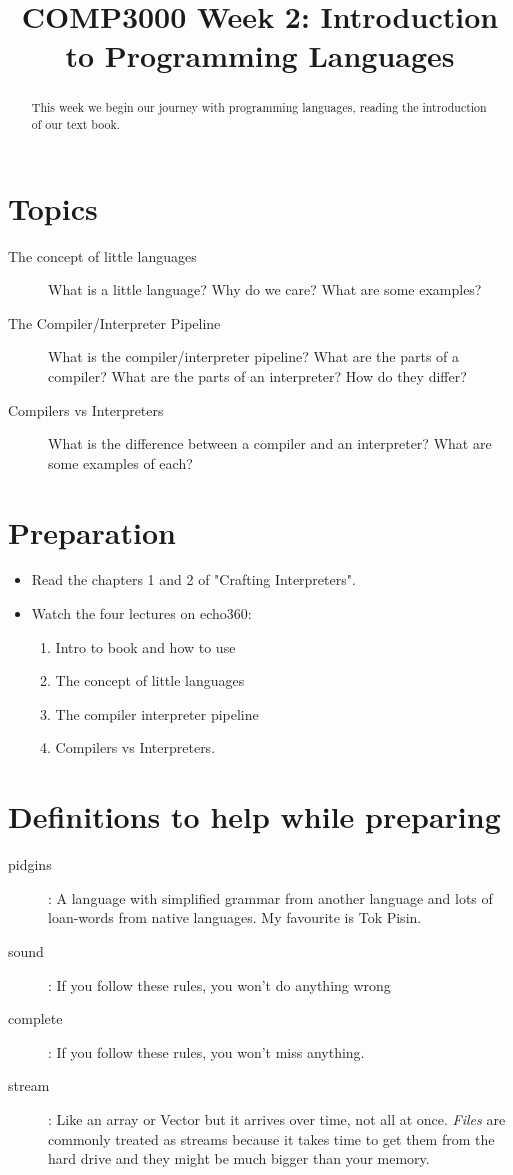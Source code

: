 \documentclass[twoside=false, DIV=14]{scrartcl}
\title{\color{redish} \vspace{-1em}COMP3000 Week 2: Introduction to Programming Languages}
\begin{document}
{\color{blackish}\maketitle}\vspace{-7em}

\begin{abstract}
  This week we begin our journey with programming languages, reading the introduction of our text book.
\end{abstract}

\section*{Topics}
\begin{description}
\item[The concept of little languages]  What is a little language?  Why do we care?  What are some examples?
\item[The Compiler/Interpreter Pipeline]  What is the compiler/interpreter pipeline?  What are the parts of a compiler?  What are the parts of an interpreter?  How do they differ?
\item[Compilers vs Interpreters]  What is the difference between a compiler and an interpreter?  What are some examples of each?
\end{description}
\section*{Preparation}
\begin{itemize}
\item Read the chapters 1 and 2 of "Crafting Interpreters".
\item Watch the four lectures on echo360: 
\begin{enumerate}
\item Intro to book and how to use
\item The concept of little languages
\item The compiler interpreter pipeline
\item Compilers vs Interpreters.
\end{enumerate}
\end{itemize}

\section*{Definitions to help while preparing}
\begin{description}
\item[pidgins]: A language with simplified grammar from another language and lots of loan-words from native languages.  My favourite is Tok Pisin.
\item[sound]: If you follow these rules, you won't do anything wrong
\item[complete]: If you follow these rules, you won't miss anything.
\item[stream]: Like an array or Vector but it arrives over time, not all at once.  \emph{Files} are commonly treated as streams because it takes time to get them from the hard drive and they might be much bigger than your memory.
\end{description}
\end{document}
